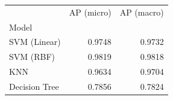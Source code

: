 \begin{tabular}{lrr}
\toprule
 & AP (micro) & AP (macro) \\
Model &  &  \\
\midrule
SVM (Linear) & 0.9748 & 0.9732 \\
SVM (RBF) & 0.9819 & 0.9818 \\
KNN & 0.9634 & 0.9704 \\
Decision Tree & 0.7856 & 0.7824 \\
\bottomrule
\end{tabular}

